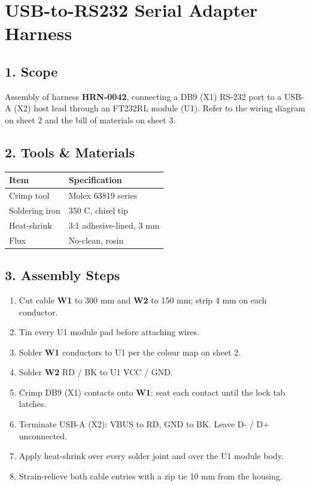 \hypertarget{usb-to-rs232-serial-adapter-harness}{%
\section{USB-to-RS232 Serial Adapter Harness}\label{usb-to-rs232-serial-adapter-harness}}

\hypertarget{1-scope}{%
\subsection{1. Scope}\label{1-scope}}

Assembly of harness \textbf{HRN-0042}, connecting a DB9 (X1) RS-232 port to a USB-A (X2) host lead through an FT232RL module (U1). Refer to the wiring diagram on sheet 2 and the bill of materials on
sheet 3.

\hypertarget{2-tools--materials}{%
\subsection{2. Tools \& Materials}\label{2-tools--materials}}

\begin{longtable}[]{@{}ll@{}}
\toprule
Item & Specification\tabularnewline
\midrule
\endhead
Crimp tool & Molex 63819 series\tabularnewline
Soldering iron & 350 C, chisel tip\tabularnewline
Heat-shrink & 3:1 adhesive-lined, 3 mm\tabularnewline
Flux & No-clean, rosin\tabularnewline
\bottomrule
\end{longtable}

\hypertarget{3-assembly-steps}{%
\subsection{3. Assembly Steps}\label{3-assembly-steps}}

\begin{enumerate}
\def\labelenumi{\arabic{enumi}.}
\tightlist
\item
  Cut cable \textbf{W1} to 300 mm and \textbf{W2} to 150 mm; strip 4 mm on each conductor.
\item
  Tin every U1 module pad before attaching wires.
\item
  Solder \textbf{W1} conductors to U1 per the colour map on sheet 2.
\item
  Solder \textbf{W2} RD / BK to U1 VCC / GND.
\item
  Crimp DB9 (X1) contacts onto \textbf{W1}; seat each contact until the lock tab latches.
\item
  Terminate USB-A (X2): VBUS to RD, GND to BK. Leave D- / D+ unconnected.
\item
  Apply heat-shrink over every solder joint and over the U1 module body.
\item
  Strain-relieve both cable entries with a zip tie 10 mm from the housing.
\end{enumerate}

